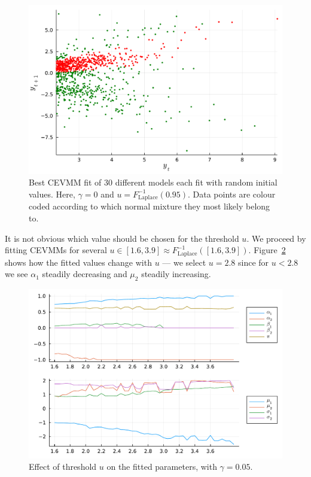 \documentclass[11pt,twoside,openany]{book}
\numberwithin{Theorem}{chapter}
\numberwithin{Definition}{chapter}
\numberwithin{Lemma}{chapter}
\numberwithin{Algorithm}{chapter}
\numberwithin{equation}{chapter}
\begin{document}
\begin{figure}[htp]
  \centering
  \includegraphics[scale=0.75]{../elexon/figures/seed_18.pdf}
  \caption{Best CEVMM fit of 30 different models each fit with random initial values.
    Here, $\gamma=0$ and $u=F_{\text{Laplace}}^{-1}(0.95)$. Data points are colour coded according to which normal mixture they most
likely belong to.}\label{fig:seed_18}
\end{figure}

\FloatBarrier
It is not obvious which value should be chosen for the threshold $u$.
We proceed by fitting CEVMMs for several $u\in[1.6,3.9]\approx
F_{\text{Laplace}}^{-1}([1.6,3.9])$. Figure~\ref{fig:imb_param_vals_changing_u}
shows how the fitted values change with $u$ --- we select $u=2.8$
since for $u<2.8$ we see $\alpha_1$ steadily decreasing and $\mu_2$ steadily increasing.

\begin{figure}[htp]
  \centering
  \includegraphics[scale=0.75]{../elexon/figures/imb_param_vals_changing_u.pdf}
  \caption{Effect of threshold $u$ on the fitted parameters, with $\gamma=0.05$.}\label{fig:imb_param_vals_changing_u}
\end{figure}
\end{document}
